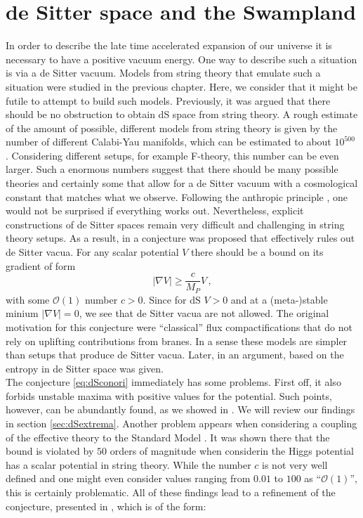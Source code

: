 \documentclass[12pt]{report}
\newcommand{\be}{\begin{equation}}
\newcommand{\ee}{\end{equation}}
\begin{document}
\section{de Sitter space and the Swampland}
In order to describe the late time accelerated expansion of our universe it is necessary to have a positive vacuum energy. One way to describe such a situation is via a de Sitter vacuum. Models from string theory that emulate such a situation were studied in the previous chapter. Here, we consider that it might be futile to attempt to build such models. Previously, it was argued that there should be no obstruction to obtain dS space from string theory. A rough estimate of the amount of possible, different models from string theory is given by the number of different Calabi-Yau manifolds, which can be estimated to about $10^{500}$ \cite{Blumenhagen:2004xx}. Considering different setups, for example F-theory, this number can be even larger. Such a enormous numbers suggest that there should be many possible theories and certainly some that allow for a de Sitter vacuum with a cosmological constant that matches what we observe. Following the anthropic principle \cite{Weinberg:1987dv}, one would not be surprised if everything works out. Nevertheless, explicit constructions of de Sitter spaces remain very difficult and challenging in string theory setups. As a result, in \cite{Obied:2018sgi} a conjecture was proposed that effectively rules out de Sitter vacua. For any scalar potential $V$ there should be a bound on its gradient of form
\be 
|\nabla V| \geq \frac{c}{M_P} V\,,
\label{eq:dSconori}
\ee
with some $\mathcal{O}(1)$ number $c>0$. Since for dS $V>0$ and at a (meta-)stable minium $|\nabla V| = 0$, we see that de Sitter vacua are not allowed. The original motivation for this conjecture were ``classical'' flux compactifications that do not rely on uplifting contributions from branes. In a sense these models are simpler than setups that produce de Sitter vacua. Later, in \cite{Ooguri:2018wrx} an argument, based on the entropy in de Sitter space was given.\\
The conjecture \eqref{eq:dSconori} immediately has some problems. First off, it also forbids unstable maxima with positive values for the potential. Such points, however, can be abundantly found, as we showed in \cite{Roupec:2018mbn}. We will review our findings in section \ref{sec:dSextrema}. Another problem appears when considering a coupling of the effective theory to the Standard Model \cite{Denef:2018etk}. It was shown there that the bound is violated by $50$ orders of magnitude when considerin the Higgs potential has a scalar potential in string theory. While the number $c$ is not very well defined and one might even consider values ranging from $0.01$ to $100$ as ``$\mathcal{O}(1)$'', this is certainly problematic. All of these findings lead to a refinement of the conjecture, presented in \cite{Ooguri:2018wrx}, which is of the form:
\end{document}
